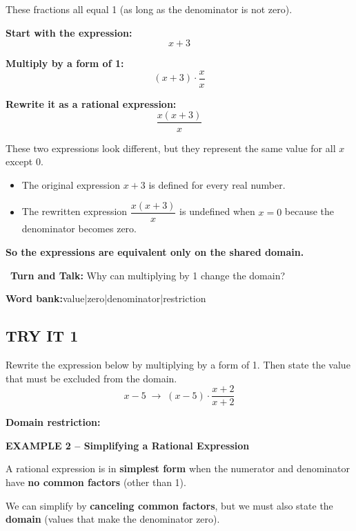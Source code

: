 \documentclass[11pt]{article}
\newcommand{\blk}[1][1.2cm]{\underline{\hspace{#1}}}
\newcommand{\examplehead}[1]{%
  \vspace{6pt}%
  \noindent\colorbox{hlcyan}{\parbox{\dimexpr\linewidth-2\fboxsep}{\textbf{#1}}}%
  \vspace{2pt}%
}
\newcommand{\turnandtalk}[1]{%
  \vspace{3pt}%
  \noindent\textbullet~\textbf{Turn and Talk:} #1\par%
}
\begin{document}
\noindent These fractions all equal 1 (as long as the denominator is not zero).

\noindent\textbf{Start with the expression:}
\[ x+3 \]

\noindent\textbf{Multiply by a form of 1:}
\[ (x+3)\cdot\frac{x}{x} \]

\noindent\textbf{Rewrite it as a rational expression:}
\[ \frac{x(x+3)}{x} \]

\noindent These two expressions look different, but they represent the same
value for all $x$ except $0$.
\begin{itemize}[leftmargin=1.5em,itemsep=1pt,topsep=2pt]
  \item The original expression $x+3$ is defined for every real number.
  \item The rewritten expression $\dfrac{x(x+3)}{x}$ is undefined when $x=0$
        because the denominator becomes zero.
\end{itemize}

\noindent\textbf{So the expressions are equivalent only on the shared domain.}

\turnandtalk{Why can multiplying by 1 change the domain?}

\begin{frames}
  \textbf{Word bank:}\quad value\quad|\quad zero\quad|\quad denominator\quad|\quad restriction
\end{frames}

\subsection*{TRY IT 1}
\noindent Rewrite the expression below by multiplying by a form of 1.
Then state the value that must be excluded from the domain.
\[
  x-5 \;\longrightarrow\; (x-5)\cdot\frac{x+2}{x+2}
\]

\noindent\textbf{Domain restriction:}\;\blk[4cm]

\examplehead{EXAMPLE 2 -- Simplifying a Rational Expression}

\noindent A rational expression is in \textbf{simplest form} when the
numerator and denominator have \textbf{no common factors} (other than 1).

\noindent We can simplify by \textbf{canceling common factors}, but we must
also state the \textbf{domain} (values that make the denominator zero).
\end{document}
